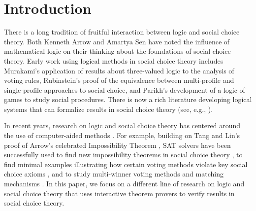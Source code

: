 \documentclass[runningheads]{llncs}
\begin{document}
\section{Introduction}

There is a long tradition of fruitful interaction between logic and social choice theory.  Both Kenneth Arrow \cite[p. 154]{Arrow2014}  and Amartya Sen \cite[p. 108]{Sen2017} have noted the influence of mathematical logic on their thinking about the foundations of social choice theory.  Early work using logical methods in social choice theory includes  Murakami's  \cite{Murakami1968}  application of  results about three-valued logic to the analysis of voting rules, Rubinstein's \cite{Rubinstein1984}  proof of the equivalence between multi-profile and single-profile approaches to social choice, and Parikh's \cite{Parikh1985} development of a logic of games to study social procedures.  There is now a rich literature developing logical systems that can formalize results in social choice theory (see, e.g., \cite{Pauly2008,AgotnesVanDerHoekWooldridge2009,Nipkow2009,Tang2011,TroquardVanDerHoekWooldridge2011,Endriss2011,GrandiEndriss2013,CinaEndriss2016,PacuitYang2016,HollidayPacuit2020}). 

In recent years, research on  logic and social choice theory has centered around the use of computer-aided methods \cite{Geist2017}.    For example, building on Tang and Lin's \cite{Tang2009} proof of Arrow's celebrated Impossibility Theorem \cite{Arrow2012},  SAT solvers have been successfully used to find new impossibility theorems in social choice theory \cite{Geist2011,Brandt2014,Geist2017,Brandl2018,Brandt2018,Brandl2019}, to find minimal examples illustrating how certain voting methods violate key social choice axioms \cite{Brandt2017}, and to study  multi-winner voting methods \cite{Kluiving2020} and matching mechanisms \cite{Drummond2015,Endriss2020}. 
In this paper, we focus on a different line of research on logic and social choice theory that uses interactive theorem provers to verify results in social choice theory.   
\end{document}
